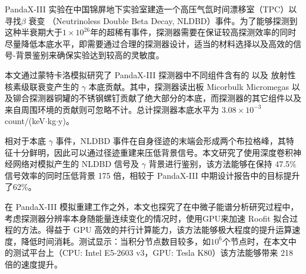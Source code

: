 
\begin{cabstract}
	\pkuthssffaq %
	PandaX-III 实验在中国锦屏地下实验室建造一个高压气氙时间漂移室（TPC）以寻找 $\beta$ 衰变 （Neutrinoless Double Beta Decay, NLDBD）事件。为了能够探测到这种半衰期大于$1\times10^{26}$年的超稀有事件，探测器需要在保证较高探测效率的同时尽量降低本底水平，即需要通过合理的探测器设计，适当的材料选择以及高效的信号-背景鉴别来确保实验达到较高的灵敏度。

	本文通过蒙特卡洛模拟研究了 PandaX-III 探测器中不同组件含有的 \utte 以及 \thttt 放射性核素级联衰变产生的 $\gamma$ 本底贡献。其中，探测器读出板 Micorbulk Micromegas 以及铆合探测器铜罐的不锈钢螺钉贡献了绝大部分的本底，而探测器的其它组件以及来自周围环境的贡献则可忽略不计。总计探测器本底水平为 $3.08\times 10^{-3}$ count/(keV$\cdot$kg$\cdot$y)。

	相对于本底 $\gamma$ 事件，NLDBD 事件在自身径迹的末端会形成两个布拉格峰，其特征十分鲜明，因此可以通过径迹重建来压低背景信号。本文研究了使用深度卷积神经网络对模拟产生的 NLDBD 信号及 $\gamma$ 背景进行鉴别，该方法能够在保持 47.5\% 信号效率的同时压低背景 175 倍，相较于 PandaX-III 中期设计报告中的目标提升了62\%。

	在 PandaX-III 模拟重建工作之外，本文也探究了在中微子能谱分析研究过程中，考虑探测器分辨率本身随能量连续变化的情况时，使用GPU来加速 Roofit 拟合过程的方法。得益于 GPU 高效的并行计算能力，该方法能够极大程度的提升运算速度，降低时间消耗。测试显示：当积分节点数目较多，如$10^6$个节点时，在本文中的测试平台上（CPU: Intel E5-2603 v3，GPU: Tesla K80）该方法能够带来 218 倍的速度提升。

\end{cabstract}

